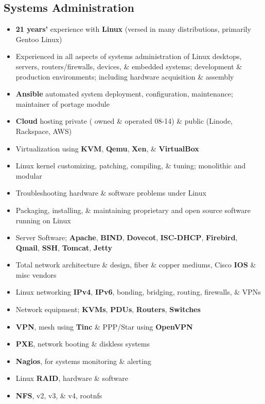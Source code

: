 \documentclass[10pt]{report}
\begin{document}
\subsection*{Systems Administration}
\begin{itemize}
  \item \textbf{21 years’} experience with \textbf{Linux} (versed in many distributions, primarily Gentoo Linux)
  \item Experienced in all aspects of systems administration of Linux desktops, servers, routers/firewalls, devices,
\& embedded systems; development \& production environments; including hardware acquisition \& assembly 
  \item \textbf{Ansible} automated system deployment, configuration, maintenance; maintainer of portage module
  \item \textbf{Cloud} hosting private ( owned \& operated 08-14) \& public (Linode, Rackspace, AWS)
  \item Virtualization using \textbf{KVM}, \textbf{Qemu}, \textbf{Xen}, \& \textbf{VirtualBox}
  \item Linux kernel customizing, patching, compiling, \& tuning; monolithic and modular
  \item Troubleshooting hardware \& software problems under Linux
  \item Packaging, installing, \& maintaining proprietary and open source software running on Linux
  \item Server Software; \textbf{Apache}, \textbf{BIND}, \textbf{Dovecot}, \textbf{ISC-DHCP}, \textbf{Firebird}, \textbf{Qmail}, \textbf{SSH}, \textbf{Tomcat}, \textbf{Jetty}
  \item Total network architecture \& design, fiber \& copper mediums, Cisco \textbf{IOS} \& misc vendors
  \item Linux networking \textbf{IPv4}, \textbf{IPv6}, bonding, bridging, routing, firewalls, \& VPNs
  \item Network equipment; \textbf{KVMs}, \textbf{PDUs}, \textbf{Routers}, \textbf{Switches}
  \item \textbf{VPN}, mesh using \textbf{Tinc} \& PPP/Star using \textbf{OpenVPN}
  \item \textbf{PXE}, network booting \& diskless systems
  \item \textbf{Nagios}, for systems monitoring \& alerting
  \item Linux \textbf{RAID}, hardware \& software
  \item \textbf{NFS}, v2, v3, \& v4, rootnfs
\end{itemize}
\end{document}
